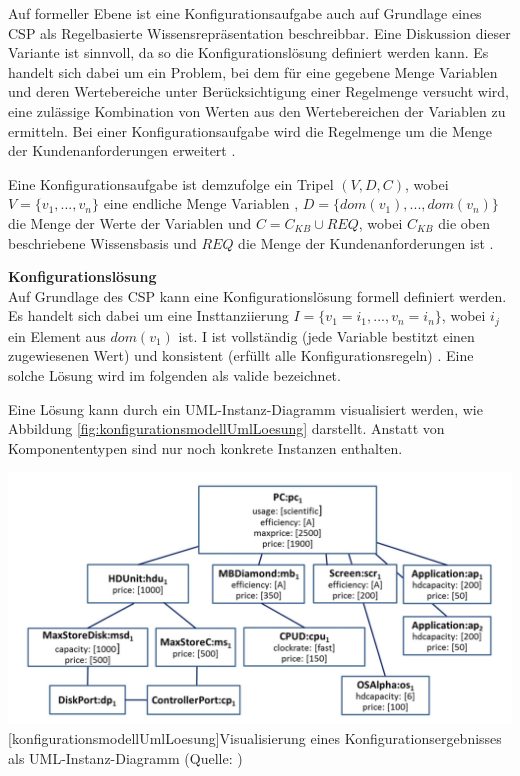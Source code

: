 \documentclass[12pt,a4paper,bibliography=totocnumbered,listof=totoc]{scrartcl}
\begin{document}
Auf formeller Ebene ist eine Konfigurationsaufgabe auch auf Grundlage eines \ac{CSP} als \glqq Regelbasierte Wissensrepräsentation\grqq{} beschreibbar. Eine Diskussion dieser Variante ist sinnvoll, da so die Konfigurationslösung definiert werden kann. Es handelt sich dabei um ein Problem, bei dem für eine gegebene Menge Variablen und deren Wertebereiche unter Berücksichtigung einer Regelmenge versucht wird, eine zulässige Kombination von Werten aus den Wertebereichen der Variablen zu ermitteln. Bei einer Konfigurationsaufgabe wird die Regelmenge um die Menge der Kundenanforderungen erweitert \citep{felferning14}.

Eine Konfigurationsaufgabe ist demzufolge ein Tripel $(V, D, C)$, wobei $V = \{v_1, ..., v_n\}$ eine endliche Menge Variablen ,  $D  = \{dom(v_1), ..., dom(v_n)\}$ die Menge der Werte der Variablen und $C = C_{KB} \cup REQ$, wobei $C_{KB}$ die oben beschriebene Wissensbasis und $REQ$ die Menge der Kundenanforderungen ist \citep{felferning14}.

\textbf{Konfigurationslösung}\\
Auf Grundlage des \ac{CSP} kann eine Konfigurationslösung formell definiert werden. Es handelt sich dabei um eine Insttanziierung $I = \{v_1 = i_1, ..., v_n = i_n\}$, wobei $i_j$ ein Element aus $dom(v_1)$ ist. I ist vollständig (jede Variable bestitzt einen zugewiesenen Wert) und konsistent (erfüllt alle Konfigurationsregeln) \citep{falkner11}. Eine solche Lösung wird im folgenden als valide bezeichnet.

Eine Lösung kann durch ein UML-Instanz-Diagramm visualisiert werden, wie Abbildung \ref{fig:konfigurationsmodellUmlLoesung} darstellt. Anstatt von Komponententypen sind nur noch konkrete Instanzen enthalten.

\vspace{1em}
\begin{minipage}{\linewidth}
	\centering
	\includegraphics[width=0.9\linewidth]{Abbildungen/konfigurationsmodellUmlLoesung.png}
	[konfigurationsmodellUmlLoesung]{Visualisierung eines Konfigurationsergebnisses als UML-Instanz-Diagramm (Quelle: \cite{felferning14})}
	\label{fig:konfigurationsmodellUmlLoesung}
\end{minipage}
\vspace{1em}
\end{document}
